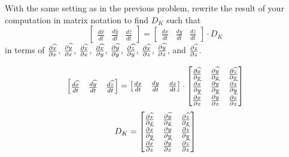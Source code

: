 \documentclass{ximera}
\begin{document}
\begin{problem}
  With the same setting as in the previous problem, rewrite the result
  of your computation in matrix notation to find $D_K$ such that
\[
\begin{bmatrix}
\frac{d\hat{x}}{dt} & \frac{d\hat{y}}{dt} & \frac{d\hat{z}}{dt}%
\end{bmatrix}
=
\begin{bmatrix}
\frac{dx}{dt} & \frac{dy}{dt} & \frac{dz}{dt}%
\end{bmatrix}\cdot D_K
\]
in terms of $\pp[\hat x]{x}$, $\pp[\hat y]{x}$, $\pp[\hat z]{x}$,
$\pp[\hat x]{y}$, $\pp[\hat y]{y}$, $\pp[\hat z]{y}$, $\pp[\hat x]{z}$,
$\pp[\hat y]{z}$, and $\pp[\hat z]{z}$.

\begin{freeResponse}
\[
\begin{bmatrix}
\frac{d\hat{x}}{dt} & \frac{d\hat{y}}{dt} & \frac{d\hat{z}}{dt}%
\end{bmatrix}
=
\begin{bmatrix}
\frac{dx}{dt} & \frac{dy}{dt} & \frac{dz}{dt}%
\end{bmatrix}\cdot
\begin{bmatrix}
\pp[\hat x]{x} & \pp[\hat y]{x} & \pp[\hat z]{x} \\
\pp[\hat x]{y} & \pp[\hat y]{y} & \pp[\hat z]{y} \\
\pp[\hat x]{z} &\pp[\hat y]{z} & \pp[\hat z]{z}
\end{bmatrix}
\]
\[
D_K = 
\begin{bmatrix}
\pp[\hat x]{x} & \pp[\hat y]{x} & \pp[\hat z]{x} \\
\pp[\hat x]{y} & \pp[\hat y]{y} & \pp[\hat z]{y} \\
\pp[\hat x]{z} &\pp[\hat y]{z} & \pp[\hat z]{z}
\end{bmatrix}
\]

\end{freeResponse}
\end{problem}
\end{document}
